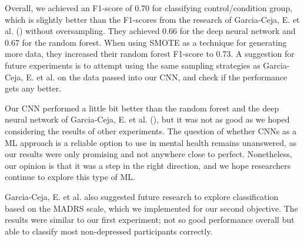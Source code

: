 Overall, we achieved an F1-score of 0.70 for classifying control/condition group, which is slightly better than the F1-scores from the research of Garcia-Ceja, E. et al. (\cite{GarciaCeja2018_classification_bipolar}) without oversampling. They achieved 0.66 for the deep neural network and 0.67 for the random forest. When using SMOTE as a technique for generating more data, they increased their random forest F1-score to 0.73. A suggestion for future experiments is to attempt using the same sampling strategies as Garcia-Ceja, E. et al. on the data passed into our CNN, and check if the performance gets any better. 

Our CNN performed a little bit better than the random forest and the deep neural network of Garcia-Ceja, E. et al. (\cite{GarciaCeja2018_classification_bipolar}), but it was not as good as we hoped considering the results of other experiments. The question of whether CNNs as a ML approach is a reliable option to use in mental health remains unanswered, as our results were only promising and not anywhere close to perfect. Nonetheless, our opinion is that it was a step in the right direction, and we hope researchers continue to explore this type of ML.

Garcia-Ceja, E. et al. also suggested future research to explore classification based on the MADRS scale, which we implemented for our second objective. The results were similar to our first experiment; not so good performance overall but able to classify most non-depressed participants correctly. 

